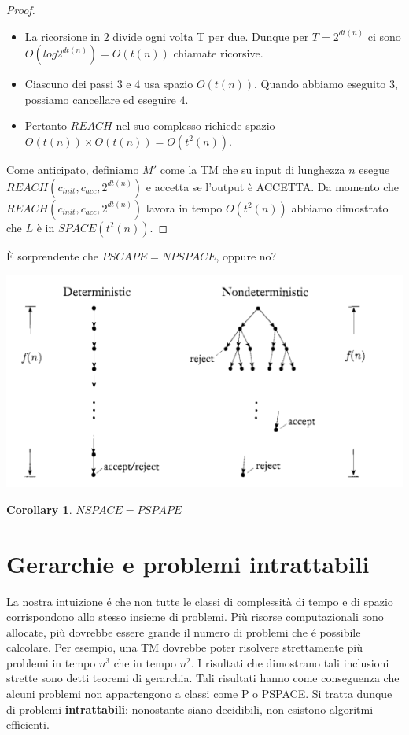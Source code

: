 \documentclass[a4paper, 12pt]{article}
\newtheorem{corollary}{Corollary}[theorem]
\begin{document}
\begin{proof}
\begin{itemize}
\item La ricorsione in $2$ divide ogni volta T per due. Dunque per $T=2^{dt(n)}$ ci sono $O(log 2^{dt(n)}) = O(t(n))$ chiamate ricorsive.
\item Ciascuno dei passi $3$ e $4$ usa spazio $O(t(n))$. Quando abbiamo eseguito $3$, possiamo cancellare ed eseguire $4$.
\item Pertanto $REACH$ nel suo complesso richiede spazio $O(t(n)) \times O(t(n)) = O(t^{2}(n))$.
\end{itemize}
Come anticipato, definiamo $M'$ come la TM che su input di lunghezza $n$ esegue $REACH(c_{init}, c_{acc}, 2^{dt(n)})$ e accetta se l'output \`e ACCETTA. Da momento che $REACH(c_{init}, c_{acc}, 2^{dt(n)})$ lavora in tempo $O(t^{2}(n))$ abbiamo dimostrato che $L$ \`e in $SPACE(t^{2}(n))$.
\end{proof}
\`E sorprendente che $PSCAPE=NPSPACE$, oppure no?
\begin{center}
\includegraphics[scale=0.5]{PSPACE1.png}
\end{center}

\begin{corollary}
$NSPACE = PSPAPE$
\end{corollary}
\newpage
\section{Gerarchie e problemi intrattabili}
La nostra intuizione é che non tutte le classi di complessità di tempo e di spazio corrispondono allo stesso insieme di problemi. Più risorse computazionali sono allocate, più dovrebbe essere grande il numero di problemi che é possibile calcolare. Per esempio, una TM dovrebbe poter risolvere strettamente più problemi in tempo $n^3$ che in tempo $n^2$. I risultati che dimostrano tali inclusioni strette sono detti teoremi di gerarchia. Tali risultati hanno come conseguenza che alcuni problemi non appartengono a classi come P o PSPACE. Si tratta dunque di problemi \textbf{intrattabili}: nonostante siano decidibili, non esistono algoritmi efficienti.
\end{document}
